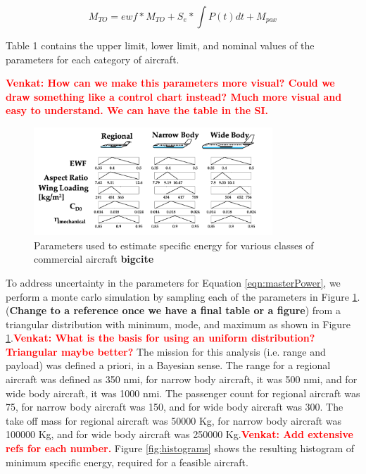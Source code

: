 \documentclass{achemso}
\newcommand{\vv}[1]{{\textbf{\textcolor{red}{Venkat: #1}}}}
\begin{document}
\begin{equation}
    M_{TO} = ewf * M_{TO} + S_e * \int P(t) dt  + M_{pax} 
    \label{Eqn:massSum}
\end{equation}

 Table 1 contains the upper limit, lower limit, and nominal values of the parameters for each category of aircraft. 

\vv{How can we make this parameters more visual?  Could we draw something like a control chart instead?  Much more visual and easy to understand.  We can have the table in the SI.}
\begin{figure}[htp]
\centering

\includegraphics[width=0.8\textwidth]{Figures/chart_figure.png}

\caption{Parameters used to estimate specific energy for various classes of commercial aircraft \textbf{bigcite}}
\label{fig:params}

\end{figure}


To address uncertainty in the parameters for Equation \eqref{eqn:masterPower}, we perform a monte carlo simulation by sampling each of the parameters in Figure \ref{fig:params}. (\textbf{Change to a reference once we have a final table or a figure}) from a triangular distribution with minimum, mode, and maximum as shown in Figure \ref{fig:params}.\vv{What is the basis for using an uniform distribution?  Triangular maybe better?} The mission for this analysis (i.e. range and payload) was defined a priori, in a Bayesian sense.  The range for a regional aircraft was defined as 350 nmi, for narrow body aircraft, it was 500 nmi, and for wide body aircraft, it was 1000 nmi.  The passenger count for regional aircraft was 75, for narrow body aircraft was 150, and for wide body aircraft was 300. The take off mass for regional aircraft was 50000 Kg, for narrow body aircraft was 100000 Kg, and for wide body aircraft was 250000 Kg.\vv{Add extensive refs for each number.} Figure \ref{fig:histograms} shows the resulting histogram of minimum specific energy, required for a feasible aircraft.
\end{document}
